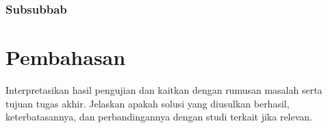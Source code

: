     \subsubsection{Subsubbab}

    \blindtext%

\blindtext%

\section{Pembahasan}

Interpretasikan hasil pengujian dan kaitkan dengan rumusan masalah
serta tujuan tugas akhir. Jelaskan apakah solusi yang diusulkan
berhasil, keterbatasannya, dan perbandingannya dengan studi terkait
jika relevan.

\blindtext%
